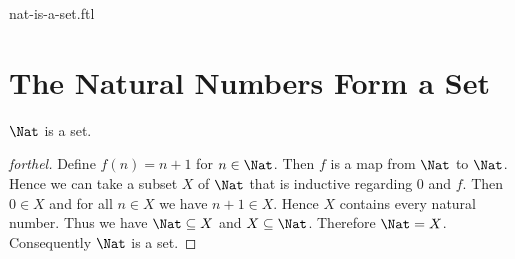 \documentclass{naproche-library}
\begin{document}
\begin{smodule}{nat-is-a-set.ftl}

  \section*{The Natural Numbers Form a Set}

  \begin{proposition}[forthel,id=ARITHMETIC_07_4685510236547454,printid]
    $\Nat$ is a set.
  \end{proposition}
  \begin{proof}[forthel]
    Define $f(n) = n + 1$ for $n \in \Nat$.
    Then $f$ is a map from $\Nat$ to $\Nat$.
    Hence we can take a subset $X$ of $\Nat$ that is inductive regarding
    $0$ and $f$.
    Then $0 \in X$ and for all $n \in X$ we have $n + 1 \in X$.
    Hence $X$ contains every natural number.
    Thus we have $\Nat \subseteq X$ and $X \subseteq \Nat$.
    Therefore $\Nat = X$.
    Consequently $\Nat$ is a set.
  \end{proof}
\end{smodule}
\end{document}
